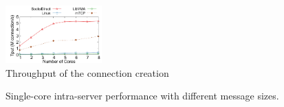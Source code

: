 
\begin{figure}[htpb]
	\centering
	\includegraphics[width=0.33\textwidth]{eval/microbenchmark/conn-setup-tput.pdf}
	\caption{Throughput of the connection creation}
	\label{fig:eval-conn-setup-tput}
\end{figure}


\begin{figure}[htpb]
	\centering
	
	\caption{Single-core intra-server performance with different message sizes.}
	\label{fig:eval-msgsize-intra}
\end{figure}

